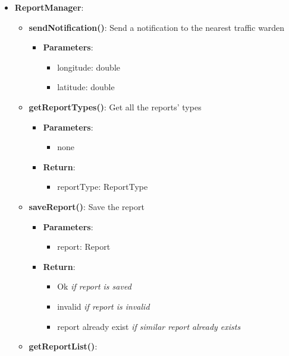 \documentclass{article}
\begin{document}
\begin{itemize}
\begin{itemize}
\begin{itemize}
				\end{itemize}
		\end{itemize}
	\item \textbf{ReportManager}:
		\begin{itemize}
			\item \textbf{sendNotification()}:
				Send a notification to the nearest traffic warden
				\begin{itemize}
					\item \textbf{Parameters}:
						\begin{itemize}
							\item longitude: double
							\item latitude: double
						\end{itemize}
				\end{itemize}
			\item \textbf{getReportTypes()}:
				Get all the reports' types
				\begin{itemize}
					\item \textbf{Parameters}:
						\begin{itemize}
							\item none
						\end{itemize}
					\item \textbf{Return}:
						\begin{itemize}
							\item reportType: \textlangle{}ReportType\textrangle{}
						\end{itemize}
				\end{itemize}
			\item \textbf{saveReport()}:
				Save the report 
			\begin{itemize}
				\item \textbf{Parameters}:
					\begin{itemize}
						\item report: Report
					\end{itemize}
				\item \textbf{Return}:
					\begin{itemize}
						\item Ok 		\textit{if report is saved}
						\item invalid 	\textit{if report is invalid}
						\item report already exist \textit{if similar report already exists}
					\end{itemize}
			\end{itemize}
			\item \textbf{getReportList()}:

\end{itemize}
\end{itemize}
\end{document}
